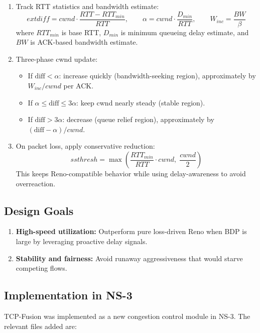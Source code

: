 \documentclass[12pt,a4paper]{article}
\begin{document}
\begin{enumerate}
    \item Track RTT statistics and bandwidth estimate:
    \[
    	ext{diff} = cwnd \cdot \frac{RTT-RTT_{min}}{RTT}, \qquad
    \alpha = cwnd \cdot \frac{D_{min}}{RTT}, \qquad
    W_{inc} = \frac{BW}{\beta}
    \]
    where $RTT_{min}$ is base RTT, $D_{min}$ is minimum queueing delay estimate, and $BW$ is ACK-based bandwidth estimate.

    \item Three-phase cwnd update:
    \begin{itemize}
        \item If $\text{diff}<\alpha$: increase quickly (bandwidth-seeking region), approximately by $W_{inc}/cwnd$ per ACK.
        \item If $\alpha \le \text{diff} \le 3\alpha$: keep cwnd nearly steady (stable region).
        \item If $\text{diff}>3\alpha$: decrease (queue relief region), approximately by $(\text{diff}-\alpha)/cwnd$.
    \end{itemize}

    \item On packet loss, apply conservative reduction:
    \[
    ssthresh = \max\!\left(\frac{RTT_{min}}{RTT}\cdot cwnd,\;\frac{cwnd}{2}\right)
    \]
    This keeps Reno-compatible behavior while using delay-awareness to avoid overreaction.
\end{enumerate}

\subsection{Design Goals}

\begin{enumerate}
    \item \textbf{High-speed utilization:} Outperform pure loss-driven Reno when BDP is large by leveraging proactive delay signals.
    \item \textbf{Stability and fairness:} Avoid runaway aggressiveness that would starve competing flows.
\end{enumerate}

\subsection{Implementation in NS-3}

TCP-Fusion was implemented as a new congestion control module in NS-3. The relevant files added are:
\end{document}
